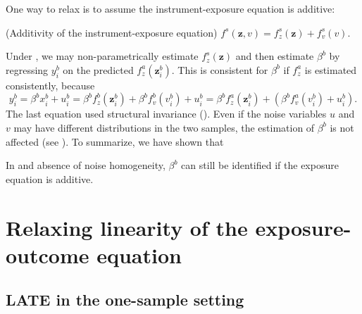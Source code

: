 \documentclass[preprint]{imsart}
\begin{document}
One way to relax  is to assume the
instrument-exposure equation is additive:
\begin{assumption} \label{assump:exposure-additive}
  (Additivity of the instrument-exposure equation) $f^s(\mathbf{z},v)
  = f^s_z(\mathbf{z}) + f^s_v(v)$.
\end{assumption}
Under , we may non-parametrically
estimate $f_z^s(\mathbf{z})$ and then estimate $\beta^b$ by
regressing $y_i^b$ on the predicted $f_z^a(\mathbf{z}_i^b)$. This is
consistent for $\beta^b$ if $f_z^a$ is estimated consistently, because
\[
y_i^b = \beta^b x_i^b + u_i^b = \beta^b f^b_z(\mathbf{z}_i^b) + \beta^b
f^b_v(v_i^b) + u_i^b = \beta^b f^a_z(\mathbf{z}_i^b) + (\beta^b
f^a_v(v_i^b) + u_i^b).
\]
The last equation used structural invariance
(). Even if the noise variables $u$ and $v$
may have different distributions in the two samples, the estimation of
$\beta^b$ is not affected (see ). To
summarize, we have shown that
\begin{proposition} \label{prop:2}
  In  and absence of noise homogeneity, $\beta^b$ can still
  be identified if the exposure equation is additive.
\end{proposition}

\section{Relaxing linearity of the exposure-outcome equation}
\label{sec:relax-line-expos}

\subsection{LATE in the one-sample setting}
\label{sec:brief-review-one}
\end{document}
